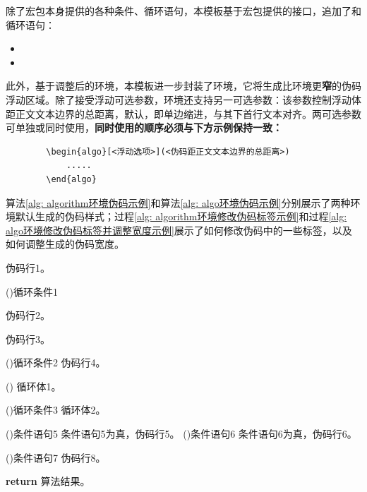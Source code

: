 \documentclass[QingNianC, vlined, timesmathnogreek]{nsfc}
\begin{document}
	除了\href{https://mirrors.sustech.edu.cn/CTAN/macros/latex/contrib/algorithm2e/doc/algorithm2e.pdf}{\ttfamily\color{DarkRed}}宏包本身提供的各种条件、循环语句，本模板基于宏包提供的接口，追加了和循环语句：
	\begin{itemize}
		\item {}
		\item {}
	\end{itemize}
	
	
	此外，基于调整后的环境，本模板进一步封装了环境，它将生成比环境更\textbf{\color{DarkRed}窄}的伪码浮动区域。除了接受浮动可选参数\shad{[htbp]}，环境还支持另一可选参数：该参数控制浮动体距正文文本边界的总距离，默认\shad{4em}，即单边缩进\shad{2em}，与其下首行文本对齐。两可选参数可单独或同时使用，\textbf{同时使用的顺序必须与下方示例保持一致：}
	
	\begin{verbatim}
		\begin{algo}[<浮动选项>](<伪码距正文文本边界的总距离>)
		    .....
		\end{algo}
	\end{verbatim}
	
	算法\ref{alg: algorithm环境伪码示例}和算法\ref{alg: algo环境伪码示例}分别展示了两种环境默认生成的伪码样式；过程\ref{alg: algorithm环境修改伪码标签示例}和过程\ref{alg: algo环境修改伪码标签并调整宽度示例}展示了如何修改伪码中的一些标签，以及如何调整生成的伪码宽度。

	
	\begin{algorithm}[!h]
		\caption{algorithm环境伪码示例} \label{alg: algorithm环境伪码示例}
		伪码行1。
		
		\For(){循环条件1}{
			伪码行2。
			
			伪码行3。
			
			\DoWhile(){循环条件2}{
				伪码行4。
			}
			
			\Loop(){
				循环体1。
			}
			
			\Repeat(){循环条件3}{
				循环体2。
			}
			
			\uIf(){条件语句5}{
				条件语句5为真，伪码行5。
			}
			\uElseIf(){条件语句6}{
				条件语句6为真，伪码行6。
			}
			
			\If(){条件语句7}{
				伪码行8。
			}
		}
		\textbf{return} 算法结果。
	\end{algorithm}
	
\end{document}

